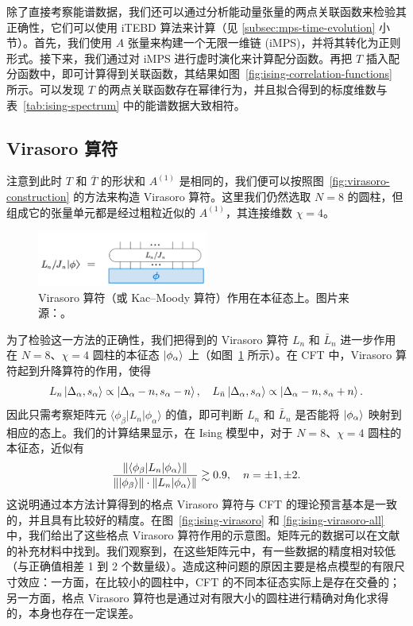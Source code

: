 除了直接考察能谱数据，我们还可以通过分析能动量张量的两点关联函数来检验其正确性，它们可以使用 iTEBD 算法来计算（见 \ref{subsec:mps-time-evolution} 小节）。首先，我们使用 $A$ 张量来构建一个无限一维链 (iMPS)，并将其转化为正则形式。接下来，我们通过对 iMPS 进行虚时演化来计算配分函数。再把 $T$ 插入配分函数中，即可计算得到关联函数，其结果如图~\ref{fig:ising-correlation-functions} 所示。可以发现 $T$ 的两点关联函数存在幂律行为，并且拟合得到的标度维数与表~\ref{tab:ising-spectrum} 中的能谱数据大致相符。

\subsection{Virasoro 算符}
\label{subsec:ising-virasoro-operator}

注意到此时 $T$ 和 $\bar{T}$ 的形状和 $A^{(1)}$ 是相同的，我们便可以按照图~\ref{fig:virasoro-construction} 的方法来构造 Virasoro 算符。这里我们仍然选取 $N=8$ 的圆柱，但组成它的张量单元都是经过粗粒近似的 $A^{(1)}$，其连接维数 $\chi=4$。

\begin{figure}[ht]
  \centering
  \includegraphics[width=0.5\textwidth]{images/virasoro/operator.pdf}
  \caption[Virasoro 算符作用在本征态上]{Virasoro 算符（或 Kac--Moody 算符）作用在本征态上。图片来源：\parencite{wang2022virasoro}。}
  \label{fig:virasoro-operator}
\end{figure}

为了检验这一方法的正确性，我们把得到的 Virasoro 算符 $L_n$ 和 $\bar{L}_n$ 进一步作用在 $N=8$、$\chi=4$ 圆柱的本征态 $\ket*{\phi_\alpha}$ 上（如图~\ref{fig:virasoro-operator} 所示）。在 CFT 中，Virasoro 算符起到升降算符的作用，使得
\begin{equation}
  L_n         \ket{\Delta_\alpha, s_\alpha} \propto \ket{\Delta_\alpha-n, s_\alpha-n}, \quad
  L_{\bar{n}} \ket{\Delta_\alpha, s_\alpha} \propto \ket{\Delta_\alpha-n, s_\alpha+n}.
\end{equation}
因此只需考察矩阵元 $\langle\phi_\beta|L_n|\phi_\alpha\rangle$ 的值，即可判断 $L_n$ 和 $\bar{L}_n$ 是否能将 $\ket*{\phi_\alpha}$ 映射到相应的态上。我们的计算结果显示，在 Ising 模型中，对于 $N=8$、$\chi=4$ 圆柱的本征态，近似有
\begin{equation}
  \frac{\lVert \langle\phi_\beta|L_n|\phi_\alpha\rangle \rVert}{\lVert \ket*{\phi_\beta} \rVert \cdot \lVert L_n\ket*{\phi_\alpha} \rVert} \gtrsim 0.9, \quad
  n=\pm1, \pm2.
\end{equation}
这说明通过本方法计算得到的格点 Virasoro 算符与 CFT 的理论预言基本是一致的，并且具有比较好的精度。在图~\ref{fig:ising-virasoro} 和 \ref{fig:ising-virasoro-all} 中，我们给出了这些格点 Virasoro 算符作用的示意图。矩阵元的数据可以在文献 \parencite{wang2022virasoro} 的补充材料中找到。我们观察到，在这些矩阵元中，有一些数据的精度相对较低（与正确值相差 1 到 2 个数量级）。造成这种问题的原因主要是格点模型的有限尺寸效应：一方面，在比较小的圆柱中，CFT 的不同本征态实际上是存在交叠的；另一方面，格点 Virasoro 算符也是通过对有限大小的圆柱进行精确对角化求得的，本身也存在一定误差。


